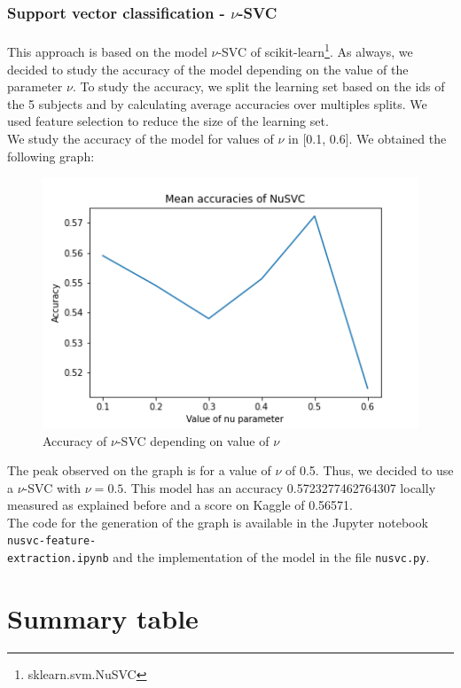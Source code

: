 \documentclass[a4paper, 11pt, oneside]{article}
\begin{document}
\subsubsection{Support vector classification - $\nu$-SVC} \label{subsubsec:nusvc}
\paragraph{}This approach is based on the model $\nu$-SVC of scikit-learn\footnote{sklearn.svm.NuSVC}. As always, we decided to study the accuracy of the model depending on the value of the parameter $\nu$. To study the accuracy, we split the learning set based on the ids of the 5 subjects and by calculating average accuracies over multiples splits. We used feature selection to reduce the size of the learning set.\\
We study the accuracy of the model for values of $\nu$ in [0.1, 0.6]. We obtained the following graph:
\begin{figure}[H]
\centering
\includegraphics[scale=0.4]{nusvm/svm_nu_svc_accuracies_1.png}
\caption{Accuracy of $\nu$-SVC depending on value of $\nu$}
\end{figure}
The peak observed on the graph is for a value of $\nu$ of 0.5. Thus, we decided to use a $\nu$-SVC with $\nu = 0.5$. This model has an accuracy 0.5723277462764307 locally measured as explained before and a score on Kaggle of 0.56571.\\
The code for the generation of the graph is available in the Jupyter notebook \texttt{nusvc-feature-\\extraction.ipynb} and the implementation of the model in the file \texttt{nusvc.py}.


\section{Summary table}
\end{document}
